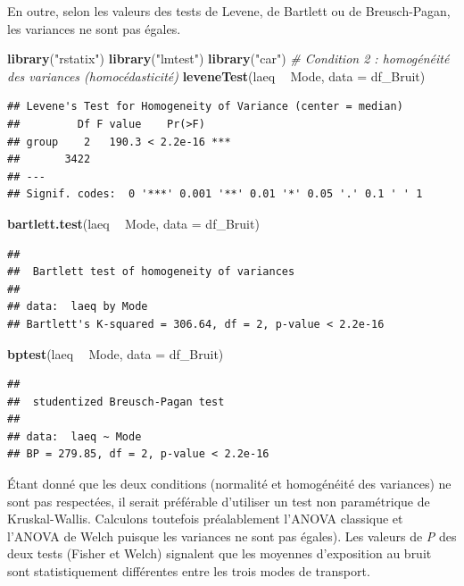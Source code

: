 \documentclass[
  11pt,
  french,
]{book}
\makeatletter
\newenvironment{Shaded}{\begin{snugshade}}{\end{snugshade}}
\newcommand{\CommentTok}[1]{\textcolor[rgb]{0.56,0.35,0.01}{\textit{#1}}}
\newcommand{\DataTypeTok}[1]{\textcolor[rgb]{0.13,0.29,0.53}{#1}}
\newcommand{\KeywordTok}[1]{\textcolor[rgb]{0.13,0.29,0.53}{\textbf{#1}}}
\newcommand{\NormalTok}[1]{#1}
\newcommand{\OperatorTok}[1]{\textcolor[rgb]{0.81,0.36,0.00}{\textbf{#1}}}
\newcommand{\StringTok}[1]{\textcolor[rgb]{0.31,0.60,0.02}{#1}}
\newenvironment{kframe}{%
\medskip{}
\setlength{\fboxsep}{.8em}
 \def\at@end@of@kframe{}%
 \ifinner\ifhmode%
  \def\at@end@of@kframe{\end{minipage}}%
  \begin{minipage}{\columnwidth}%
 \fi\fi%
 \def\FrameCommand##1{\hskip\@totalleftmargin \hskip-\fboxsep
 \colorbox{shadecolor}{##1}\hskip-\fboxsep
     \hskip-\linewidth \hskip-\@totalleftmargin \hskip\columnwidth}%
 \MakeFramed {\advance\hsize-\width
   \@totalleftmargin\z@ \linewidth\hsize
   \@setminipage}}%
 {\par\unskip\endMakeFramed%
 \at@end@of@kframe}
\renewenvironment{Shaded}{\begin{kframe}}{\end{kframe}}
\makeatother
\begin{document}
En outre, selon les valeurs des tests de Levene, de Bartlett ou de Breusch-Pagan, les variances ne sont pas égales.

\begin{Shaded}
\begin{Highlighting}[]
\KeywordTok{library}\NormalTok{(}\StringTok{"rstatix"}\NormalTok{)}
\KeywordTok{library}\NormalTok{(}\StringTok{"lmtest"}\NormalTok{)}
\KeywordTok{library}\NormalTok{(}\StringTok{"car"}\NormalTok{)}
\CommentTok{# Condition 2 : homogénéité des variances (homocédasticité)}
\KeywordTok{leveneTest}\NormalTok{(laeq }\OperatorTok{~}\StringTok{ }\NormalTok{Mode, }\DataTypeTok{data =}\NormalTok{ df_Bruit)}
\end{Highlighting}
\end{Shaded}

\begin{verbatim}
## Levene's Test for Homogeneity of Variance (center = median)
##         Df F value    Pr(>F)    
## group    2   190.3 < 2.2e-16 ***
##       3422                      
## ---
## Signif. codes:  0 '***' 0.001 '**' 0.01 '*' 0.05 '.' 0.1 ' ' 1
\end{verbatim}

\begin{Shaded}
\begin{Highlighting}[]
\KeywordTok{bartlett.test}\NormalTok{(laeq }\OperatorTok{~}\StringTok{ }\NormalTok{Mode, }\DataTypeTok{data =}\NormalTok{ df_Bruit)}
\end{Highlighting}
\end{Shaded}

\begin{verbatim}
## 
## 	Bartlett test of homogeneity of variances
## 
## data:  laeq by Mode
## Bartlett's K-squared = 306.64, df = 2, p-value < 2.2e-16
\end{verbatim}

\begin{Shaded}
\begin{Highlighting}[]
\KeywordTok{bptest}\NormalTok{(laeq }\OperatorTok{~}\StringTok{ }\NormalTok{Mode, }\DataTypeTok{data =}\NormalTok{ df_Bruit)}
\end{Highlighting}
\end{Shaded}

\begin{verbatim}
## 
## 	studentized Breusch-Pagan test
## 
## data:  laeq ~ Mode
## BP = 279.85, df = 2, p-value < 2.2e-16
\end{verbatim}

Étant donné que les deux conditions (normalité et homogénéité des variances) ne sont pas respectées, il serait préférable d'utiliser un test non paramétrique de Kruskal-Wallis. Calculons toutefois préalablement l'ANOVA classique et l'ANOVA de Welch puisque les variances ne sont pas égales). Les valeurs de \emph{P} des deux tests (Fisher et Welch) signalent que les moyennes d'exposition au bruit sont statistiquement différentes entre les trois modes de transport.
\end{document}
